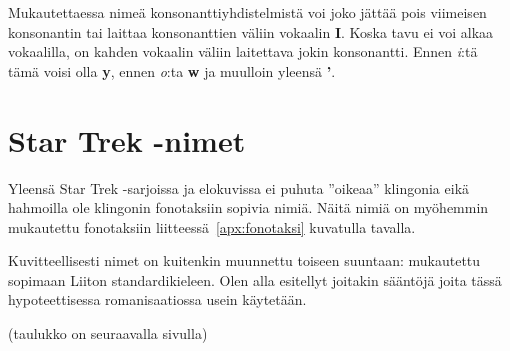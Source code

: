 \documentclass{book}
\begin{document}
Mukautettaessa nimeä konsonanttiyhdistelmistä voi joko jättää pois viimeisen konsonantin tai laittaa konsonanttien väliin vokaalin \textbf{I}. Koska tavu ei voi alkaa vokaalilla, on kahden vokaalin väliin laitettava jokin konsonantti. Ennen \textit{i}:tä tämä voisi olla \textbf{y}, ennen \textit{o}:ta \textbf{w} ja muulloin yleensä \textbf{'}.

\chapter{Star Trek -nimet}
\label{apx:startrek}

Yleensä Star Trek -sarjoissa ja elokuvissa ei puhuta ''oikeaa'' klingonia eikä hahmoilla ole klingonin fonotaksiin sopivia nimiä. Näitä nimiä on myöhemmin mukautettu fonotaksiin liitteessä~\ref{apx:fonotaksi} kuvatulla tavalla.

Kuvitteellisesti nimet on kuitenkin muunnettu toiseen suuntaan: mukautettu sopimaan Liiton standardikieleen. Olen alla esitellyt joitakin sääntöjä joita tässä hypoteettisessa romanisaatiossa usein käytetään.

(taulukko on seuraavalla sivulla)

\newcommand{\strule}[2]{\textbf{#1}$\to$\textit{#2}}
\end{document}
